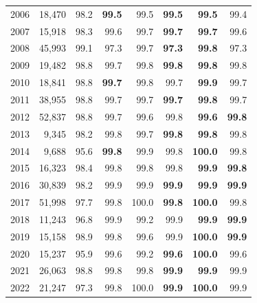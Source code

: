 {\begin{longtable}{rrrrrrrr}
2006 & 18,470 & 98.2 & \textbf{99.5} & \cellcolor{gray!15}99.5 & \cellcolor{gray!15}\textbf{99.5} & \textbf{99.5} & 99.4 \\
2007 & 15,918 & 98.3 & 99.6 & \cellcolor{gray!15}99.7 & \cellcolor{gray!15}\textbf{99.7} & \textbf{99.7} & 99.6 \\
2008 & 45,993 & 99.1 & 97.3 & \cellcolor{gray!15}99.7 & \cellcolor{gray!15}\textbf{97.3} & \textbf{99.8} & 97.3 \\
2009 & 19,482 & 98.8 & 99.7 & \cellcolor{gray!15}99.8 & \cellcolor{gray!15}\textbf{99.8} & \textbf{99.8} & 99.8 \\
2010 & 18,841 & 98.8 & \textbf{99.7} & \cellcolor{gray!15}99.8 & \cellcolor{gray!15}99.7 & \textbf{99.9} & 99.7 \\
2011 & 38,955 & 98.8 & 99.7 & \cellcolor{gray!15}99.7 & \cellcolor{gray!15}\textbf{99.7} & \textbf{99.8} & 99.7 \\
2012 & 52,837 & 98.8 & 99.7 & \cellcolor{gray!15}99.6 & \cellcolor{gray!15}99.8 & \textbf{99.6} & \textbf{99.8} \\
2013 & 9,345 & 98.2 & 99.8 & \cellcolor{gray!15}99.7 & \cellcolor{gray!15}\textbf{99.8} & \textbf{99.8} & 99.8 \\
2014 & 9,688 & 95.6 & \textbf{99.8} & \cellcolor{gray!15}99.9 & \cellcolor{gray!15}99.8 & \textbf{100.0} & 99.8 \\
2015 & 16,323 & 98.4 & 99.8 & 99.8 & 99.8 & \cellcolor{gray!15}\textbf{99.9} & \cellcolor{gray!15}\textbf{99.8} \\
2016 & 30,839 & 98.2 & 99.9 & 99.9 & \textbf{99.9} & \cellcolor{gray!15}\textbf{99.9} & \cellcolor{gray!15}\textbf{99.9} \\
2017 & 51,998 & 97.7 & 99.8 & 100.0 & \textbf{99.8} & \cellcolor{gray!15}\textbf{100.0} & \cellcolor{gray!15}99.8 \\
2018 & 11,243 & 96.8 & 99.9 & 99.2 & 99.9 & \cellcolor{gray!15}\textbf{99.9} & \cellcolor{gray!15}\textbf{99.9} \\
2019 & 15,158 & 98.9 & 99.8 & 99.6 & 99.9 & \cellcolor{gray!15}\textbf{100.0} & \cellcolor{gray!15}\textbf{99.9} \\
2020 & 15,237 & 95.9 & 99.6 & 99.2 & \textbf{99.6} & \cellcolor{gray!15}\textbf{100.0} & \cellcolor{gray!15}99.6 \\
2021 & 26,063 & 98.8 & 99.8 & 99.8 & \textbf{99.9} & \cellcolor{gray!15}\textbf{99.9} & \cellcolor{gray!15}99.9 \\
2022 & 21,247 & 97.3 & 99.8 & 100.0 & \textbf{99.9} & \cellcolor{gray!15}\textbf{100.0} & \cellcolor{gray!15}99.9 \\

\end{longtable}}
